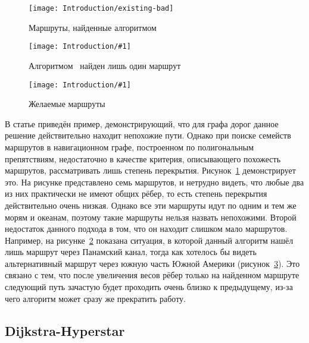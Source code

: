 \begin{figure}
    \texttt{[image: Introduction/existing-bad]}
    \caption{Маршруты, найденные алгоритмом~\cite{lim2005shortest}}
    \label{fig:limkim1}
\end{figure}

\newcommand{\limkimpicture}[1] {
    \begin{center}
    \texttt{[image: Introduction/\#1]}
    \end{center}
}

\begin{figure}
    \limkimpicture{limkim-only-one}
    \caption{Алгоритмом~\cite{lim2005shortest} найден лишь один маршрут}
    \label{fig:limkim2}
\end{figure}

\begin{figure}
    \limkimpicture{limkim-desired}
    \caption{Желаемые маршруты}
    \label{fig:limkim3}
\end{figure}

В статье приведён пример, демонстрирующий, что для графа дорог данное
решение действительно находит непохожие пути. Однако при поиске
семейств маршрутов в навигационном графе, построенном по полигональным
препятствиям, недостаточно в качестве критерия, описывающего похожесть
маршрутов, рассматривать лишь степень перекрытия.
Рисунок~\ref{fig:limkim1} демонстрирует это. На рисунке представлено
семь маршрутов, и нетрудно видеть, что любые два из них практически не
имеют общих рёбер, то есть степень перекрытия действительно очень
низкая. Однако все эти маршруты идут по одним и тем же морям и
океанам, поэтому такие маршруты нельзя назвать непохожими. Второй
недостаток данного подхода в том, что он находит слишком мало
маршрутов. Например, на рисунке~\ref{fig:limkim2} показана ситуация, в
которой данный алгоритм нашёл лишь маршрут через Панамский канал,
тогда как хотелось бы видеть альтернативный маршрут через южную часть
Южной Америки (рисунок~\ref{fig:limkim3}). Это связано с тем, что
после увеличения весов рёбер только на найденном маршруте следующий
путь зачастую будет проходить очень близко к предыдущему, из-за чего
алгоритм может сразу же прекратить работу.

\FloatBarrier

\subsection{Dijkstra-Hyperstar}

